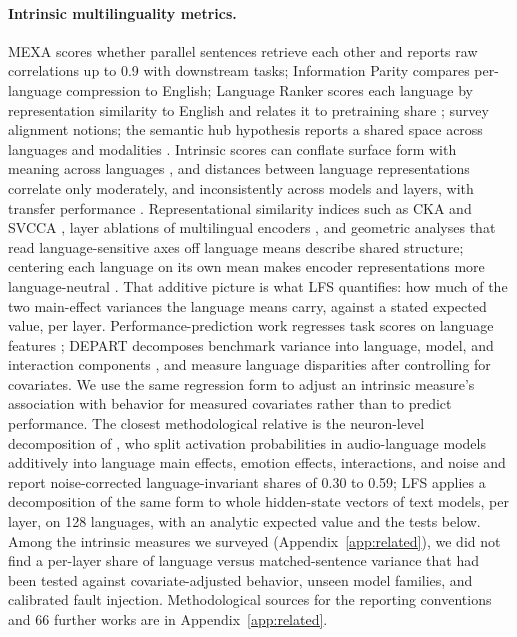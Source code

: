 \documentclass{article} %
\begin{document}
\paragraph{Intrinsic multilinguality metrics.} MEXA \citep{kargaran2024mexa}
scores whether parallel sentences retrieve each other and reports raw
correlations up to 0.9 with downstream tasks; Information Parity
\citep{tsvetkov2024ip} compares per-language compression to English; Language Ranker scores each language by representation similarity to English and relates it to pretraining share \citep{li2025ranker}; \citet{hammerl2024survey} survey alignment notions; the semantic hub hypothesis reports a shared space across languages and modalities \citep{wu2025hub}. Intrinsic scores can conflate surface form with meaning across languages \citep{poelman2026form}, and distances between language representations correlate only moderately, and inconsistently across models and layers, with transfer performance \citep{shah2024geometry}.
Representational similarity indices such as CKA \citep{kornblith2019cka} and SVCCA \citep{raghu2017svcca,kudugunta2019svcca}, layer ablations of multilingual encoders \citep{muller2021align}, and geometric analyses that read language-sensitive axes off language means \citep{chang2022geometry} describe shared structure; centering each language on its own mean makes encoder representations more language-neutral \citep{libovicky2020neutrality}. That additive picture is what LFS quantifies: how much of the two main-effect variances the language means carry, against a stated expected value, per layer.
Performance-prediction work regresses task scores on language features
\citep{lin2019langrank,xia2020nlperf}; DEPART decomposes benchmark variance into language, model, and interaction components \citep{uppadhyay2026depart}, and \citet{hu2025disparities} measure language disparities after controlling for covariates. We use the same regression form to adjust an intrinsic measure's association with behavior for measured covariates rather than to predict performance. The closest methodological relative is the neuron-level decomposition of \citet{zhao2026emotion}, who split activation probabilities in audio-language models additively into language main effects, emotion effects, interactions, and noise and report noise-corrected language-invariant shares of 0.30 to 0.59; LFS applies a decomposition of the same form to whole hidden-state vectors of text models, per layer, on 128 languages, with an analytic expected value and the tests below. Among the intrinsic measures we surveyed (Appendix~\ref{app:related}), we did not find a per-layer share of language versus matched-sentence variance that had been tested against covariate-adjusted behavior, unseen model families, and calibrated fault injection. Methodological sources for the reporting conventions and 66 further works are in Appendix~\ref{app:related}.
\end{document}

